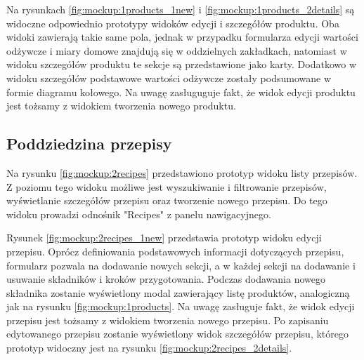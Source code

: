 
Na rysunkach \ref{fig:mockup:1products_1new} i \ref{fig:mockup:1products_2details} są widoczne odpowiednio prototypy widoków edycji i szczegółów produktu.
Oba widoki zawierają takie same pola, jednak w przypadku formularza edycji wartości odżywcze i miary domowe znajdują się w oddzielnych zakładkach,
natomiast w widoku szczegółów produktu te sekcje są przedstawione jako karty.
Dodatkowo w widoku szczegółów podstawowe wartości odżywcze zostały podsumowane w formie diagramu kołowego.
Na uwagę zasługuguje fakt, że widok edycji produktu jest tożsamy z widokiem tworzenia nowego produktu.



\subsection{Poddziedzina przepisy}

Na rysunku \ref{fig:mockup:2recipes} przedstawiono prototyp widoku listy przepisów.
Z poziomu tego widoku możliwe jest wyszukiwanie i filtrowanie przepisów, wyświetlanie szczegółów przepisu oraz tworzenie nowego przepisu.
Do tego widoku prowadzi odnośnik "Recipes" z panelu nawigacyjnego.


Rysunek \ref{fig:mockup:2recipes_1new} przedstawia prototyp widoku edycji przepisu.
Oprócz definiowania podstawowych informacji dotyczących przepisu, formularz pozwala na dodawanie nowych sekcji, a w każdej sekcji na dodawanie i usuwanie składników i kroków przygotowania.
Podczas dodawania nowego składnika zostanie wyświetlony modal zawierający listę produktów, analogiczną jak na rysunku \ref{fig:mockup:1products}.
Na uwagę zasługuje fakt, że widok edycji przepisu jest tożsamy z widokiem tworzenia nowego przepisu.
Po zapisaniu edytowanego przepisu zostanie wyświetlony widok szczegółów przepisu, którego prototyp widoczny jest na rysunku \ref{fig:mockup:2recipes_2details}.


